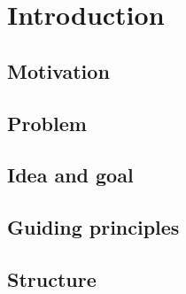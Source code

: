 
\section{Introduction}

\subsection{Motivation}

\subsection{Problem}

\subsection{Idea and goal}

\subsection{Guiding principles}

\subsection{Structure}

